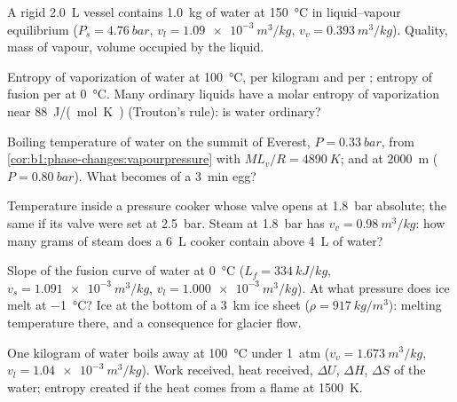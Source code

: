 \begin{exercise}[$\star$]\label{exo:b1:phase-changes:3}
A rigid \qty{2.0}{L} vessel contains \qty{1.0}{kg} of water at
\qty{150}{\degreeCelsius} in liquid--vapour equilibrium ($P_s =
\qty{4.76}{bar}$, $v_l = \qty{1.09e-3}{m^3/kg}$, $v_v = \qty{0.393}{m^3/kg}$).
Quality, mass of vapour, volume occupied by the liquid.
\end{exercise}

\begin{exercise}[$\star$]\label{exo:b1:phase-changes:4}
Entropy of vaporization of water at \qty{100}{\degreeCelsius}, per kilogram
and per ; entropy of fusion per  at \qty{0}{\degreeCelsius}. Many
ordinary liquids have a molar entropy of vaporization near
\qty{88}{J/(mol.K)} (Trouton's rule): is water ordinary?
\end{exercise}

\begin{exercise}[$\star\star$]\label{exo:b1:phase-changes:5}
Boiling temperature of water on the summit of Everest, $P =
\qty{0.33}{bar}$, from \cref{cor:b1:phase-changes:vapourpressure} with
$ML_v/R = \qty{4890}{K}$; and at \qty{2000}{m} ($P = \qty{0.80}{bar}$). What
becomes of a \qty{3}{min} egg?
\end{exercise}

\begin{exercise}[$\star\star$]\label{exo:b1:phase-changes:6}
Temperature inside a pressure cooker whose valve opens at \qty{1.8}{bar}
absolute; the same if its valve were set at \qty{2.5}{bar}. Steam at
\qty{1.8}{bar} has $v_v = \qty{0.98}{m^3/kg}$: how many grams of steam does
a \qty{6}{L} cooker contain above \qty{4}{L} of water?
\end{exercise}

\begin{exercise}[$\star\star$]\label{exo:b1:phase-changes:7}
Slope of the fusion curve of water at \qty{0}{\degreeCelsius} ($L_f =
\qty{334}{kJ/kg}$, $v_s = \qty{1.091e-3}{m^3/kg}$, $v_l = \qty{1.000e-3}{m^3/kg}$).
At what pressure does ice melt at \qty{-1}{\degreeCelsius}? Ice at the
bottom of a \qty{3}{km} ice sheet ($\rho = \qty{917}{kg/m^3}$): melting
temperature there, and a consequence for glacier flow.
\end{exercise}

\begin{exercise}[$\star\star$]\label{exo:b1:phase-changes:8}
One kilogram of water boils away at \qty{100}{\degreeCelsius} under
\qty{1}{atm} ($v_v = \qty{1.673}{m^3/kg}$, $v_l = \qty{1.04e-3}{m^3/kg}$).
Work received, heat received, $\Delta U$, $\Delta H$, $\Delta S$ of the
water; entropy created if the heat comes from a flame at
\qty{1500}{K}.
\end{exercise}

